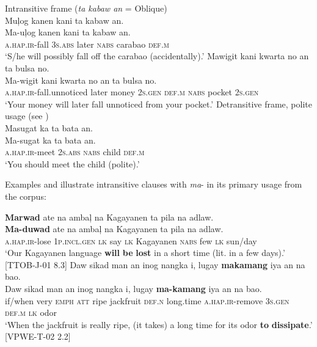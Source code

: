     \ex Intransitive frame (\textit{ta kabaw an} = Oblique) \\
    Muļog  kanen  kani  ta  kabaw  an. \\\smallskip
\gll Ma-uļog  kanen  kani  ta  kabaw  an. \\
    \textsc{a.hap.ir}-fall  3\textsc{s.abs} later  \textsc{nabs}  carabao  \textsc{def.m} \\
    \glt ‘S/he will possibly fall off the carabao (accidentally).’
    \ex
    Mawigit  kani  kwarta  no  an  ta  bulsa  no. \\\smallskip
\gll Ma-wigit  kani  kwarta  no  an  ta  bulsa  no. \\
    \textsc{a.hap.ir}-fall.unnoticed  later  money  2\textsc{s.gen}  \textsc{def.m}  \textsc{nabs}  pocket  2\textsc{s.gen}\\
    \glt ‘Your money will later fall unnoticed from your pocket.’ 
    \newpage
    \ex Detransitive frame, polite usage (see ) \\
    Masugat  ka  ta  bata  an. \\\smallskip
\gll Ma-sugat  ka  ta  bata  an. \\
    \textsc{a.hap.ir}-meet  2\textsc{s.abs}  \textsc{nabs}  child  \textsc{def.m} \\
    \glt ‘You should meet the child (polite).’    
    \z
\z

Examples  and  illustrate intransitive clauses with \textit{ma}{}- in its primary usage from the corpus:

\ea
\label{bkm:Ref440036963}
\textbf{Marwad}  ate  na  ambaļ  na  Kagayanen  ta  pila  na  adlaw. \\\smallskip
 \gll \textbf{Ma-duwad}  ate  na  ambaļ  na  Kagayanen  ta  pila  na  adlaw. \\
\textsc{a.hap.ir}-lose  1\textsc{p.incl.gen}  \textsc{lk}  say  \textsc{lk}  Kagayanen  \textsc{nabs}  few  \textsc{lk}  sun/day \\
\glt ‘Our Kagayanen language \textbf{will} \textbf{be} \textbf{lost} in a short time (lit. in a few days).’ [TTOB-J-01 8.3]
\z
\ea
\label{bkm:Ref119941820}
Daw  sikad  man  an  inog  nangka  i,  lugay  \textbf{makamang} iya  an  na  bao. \\\smallskip
 \gll Daw  sikad  man  an  inog  nangka  i,  lugay  \textbf{ma-kamang} iya  an  na  bao. \\
if/when  very  \textsc{emph}  \textsc{att}  ripe  jackfruit  \textsc{def.n}  long.time  \textsc{a.hap.ir}-remove 3\textsc{s.gen}  \textsc{def.m}  \textsc{lk}  odor \\
\glt `When the jackfruit is really ripe, (it takes) a long time for its odor \textbf{to} \textbf{dissipate}.’ [VPWE-T-02 2.2]
\z

